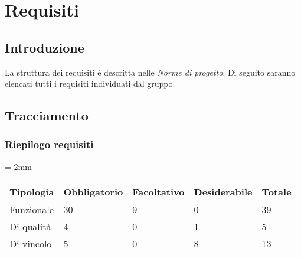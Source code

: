 \section{Requisiti}

    \subsection{Introduzione}
    La struttura dei requisiti è descritta nelle \emph{Norme di progetto}. Di seguito saranno elencati tutti i requisiti individuati dal gruppo. 
    
    
    
    
    
    
    \subsection{Tracciamento}
    
    
    \subsubsection{Riepilogo requisiti}
    
    \tabulinesep = 2mm %
    \begin{longtabu} to \textwidth {| X | X | X | X | X |} %
    \hline
        
    \textbf{Tipologia} & \textbf{Obbligatorio} & \textbf{Facoltativo} & \textbf{Desiderabile} & \textbf{Totale} \\
    \hline
    Funzionale & 30 & 9 & 0 & 39\\
    \hline
    Di qualità & 4 & 0 & 1 & 5\\
    \hline
    Di vincolo & 5 & 0 & 8 & 13\\
    \hline
    
    \end{longtabu}






